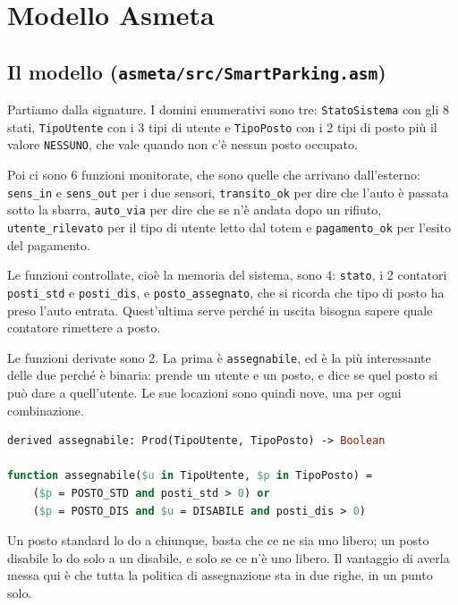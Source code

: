 \section{Modello Asmeta}

\subsection{Il modello (\texttt{asmeta/src/SmartParking.asm})}
\label{sec:modello}

Partiamo dalla signature. I domini enumerativi sono tre: \texttt{StatoSistema} con gli
8 stati, \texttt{TipoUtente} con i 3 tipi di utente e \texttt{TipoPosto} con i 2
tipi di posto più il valore \texttt{NESSUNO}, che vale quando non c'è nessun posto
occupato.

Poi ci sono 6 funzioni monitorate, che sono quelle che arrivano dall'esterno: \texttt{sens\_in} e \texttt{sens\_out} per i due sensori,
\texttt{transito\_ok} per dire che l'auto è passata sotto la sbarra, \texttt{auto\_via}
per dire che se n'è andata dopo un rifiuto, \texttt{utente\_rilevato} per il tipo di
utente letto dal totem e \texttt{pagamento\_ok} per l'esito del pagamento.

Le funzioni controllate, cioè la memoria del sistema, sono 4: \texttt{stato},
i 2 contatori \texttt{posti\_std} e \texttt{posti\_dis}, e \texttt{posto\_assegnato},
che si ricorda che tipo di posto ha preso l'auto entrata. Quest'ultima serve perché in
uscita bisogna sapere quale contatore rimettere a posto.

Le funzioni derivate sono 2. La prima è \texttt{assegnabile}, ed è la più
interessante delle due perché è binaria: prende un utente e un posto, e
dice se quel posto si può dare a quell'utente. Le sue locazioni sono quindi nove, una per
ogni combinazione.

\begin{lstlisting}[language=Pascal, caption={Funzione derivata assegnabile}]
derived assegnabile: Prod(TipoUtente, TipoPosto) -> Boolean

function assegnabile($u in TipoUtente, $p in TipoPosto) =
    ($p = POSTO_STD and posti_std > 0) or
    ($p = POSTO_DIS and $u = DISABILE and posti_dis > 0)
\end{lstlisting}

Un posto standard lo do a chiunque, basta che ce ne sia uno libero; un
posto disabile lo do solo a un disabile, e solo se ce n'è uno libero. Il vantaggio di
averla messa qui è che tutta la politica di assegnazione sta in due righe, in un punto
solo.

